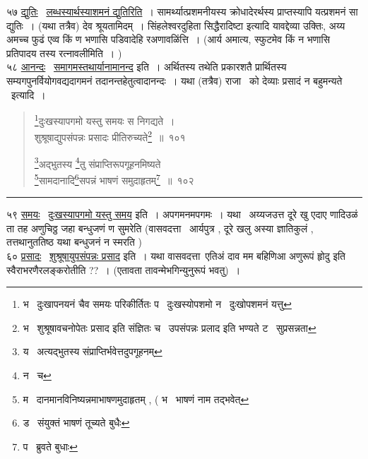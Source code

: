 \documentclass[11pt, openany]{book}
\begin{document}
५७ \underline{द्युतिः} \textendash\ \underline{लब्धस्यार्थस्याशमनं द्युतिरिति}~। सामर्थ्यात्प्रशमनीयस्य क्रोधादेरर्थस्य प्राप्तस्यापि यत्प्रशमनं सा द्युतिः~। (यथा तत्रैव) देव श्रूयतामिदम्~। सिंहलेश्वरदुहिता सिद्धैरादिष्टा इत्यादि यावद्देव्या उक्तिः, अय्य अमच्च फुढं एव्व किं ण भणासि पडिवादेहि रअणावळिंत्ति~। (आर्य अमात्य, स्फुटमेव किं न भणासि प्रतिपादय तस्य रत्नावलीमिति~। )\\

५८ \underline{आनन्दः} \textendash\ \underline{समागमस्तथार्यानामानन्द} इति~। अर्थितस्य तथेति प्रकारशतै प्रार्थितस्य सम्यगपुनर्वियोगवद्यदागमनं तदानन्तहेतुत्वादानन्दः~। यथा (तत्रैव) राजा \textendash\ को देव्याः प्रसादं न बहुमन्यते \textendash\ इत्यादि~।

\newpage

\begin{quote}
{\na \renewcommand{\thefootnote}{1}\footnote{भ \textendash\ दुःखापनयनं चैव समयः परिकीर्तितः प \textendash\ दुःखस्योपशमो न \textendash\ दुःखोपशमनं यत्तु}दुःखस्यापगमो यस्तु समयः स निगद्यते~।\\
शुश्रूषाद्युपसंपन्नः प्रसादः प्रीतिरुच्यते\renewcommand{\thefootnote}{2}\footnote{भ \textendash\ शुश्रूषावचनोपेतः प्रसाद इति संज्ञितः च \textendash\ उपसंपन्नः प्रलाद इति भण्यते ट \textendash\ सुप्रसन्नता}~॥~१०१

\renewcommand{\thefootnote}{3}\footnote{य \textendash\ अत्यद्भुतस्य संप्राप्तिर्भवेत्तदुपगूहनम्}अद्भुतस्य \renewcommand{\thefootnote}{4}\footnote{न \textendash\ च}तु संप्राप्तिरूपगूहनमिष्यते\\
\renewcommand{\thefootnote}{5}\footnote{म \textendash\ दानमानविनिष्यन्नमाभाषणमुदाहृतम् , ( भ \textendash\ भाषणं नाम तद्भवेत्}सामदानादि\renewcommand{\thefootnote}{6}\footnote{ड \textendash\ संयुक्तं भाषणं तूच्यते बुधैः}सपन्नं भाषणं समुदाहृतम्\renewcommand{\thefootnote}{7}\footnote{प \textendash\ ब्रुवते बुधाः}~॥~१०२}
\end{quote}

\hrule

\vspace{2mm}
५९ \underline{समयः} \textendash\ \underline{दुःखस्यापगमो यस्तु समय} इति~। अपगमनमपगमः~। यथा \textendash\ अय्यजउत्त दूरे खु एदाए णादिउळं ता तह अणुचिठ्ठ जहा बन्धुजणं ण सुमरेति (वासवदत्ता \textendash\ आर्यपुत्र , दूरे खलु अस्या ज्ञातिकुलं , तत्तथानुततिष्ठ यथा बन्धुजनं न स्मरति )\\

६० \underline{प्रसादः} \textendash\ \underline{शुश्रूषायुपसंपन्नः प्रसाद} इति~। यथा वासवदत्ता\textendash\ {\qt एतिअं दाव मम बहिणिआ अणुरूपं हृोदु} इति स्वैराभरणैरलङ्करोतीति ??~। (एतावता तावन्मेभगिन्युनुरूपं भवतु)~।\\
\end{document}
